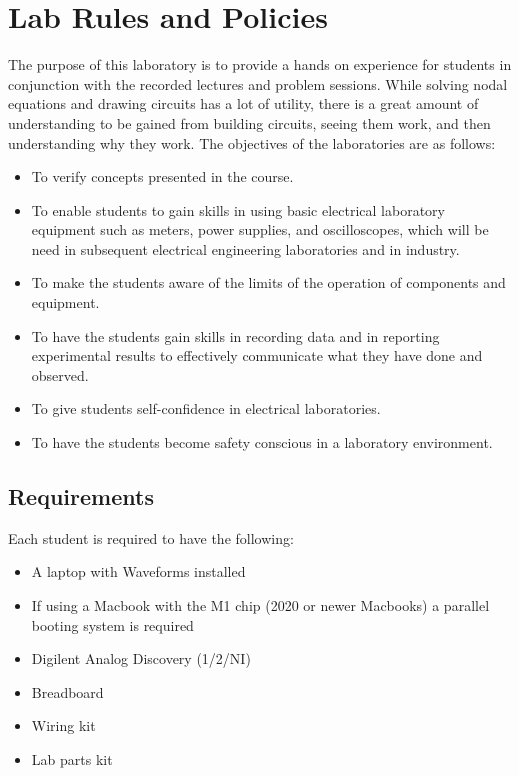 \chapter{Lab Rules and Policies}

The purpose of this laboratory is to provide a hands on experience for students in conjunction with the recorded lectures and problem sessions. While solving nodal equations and drawing circuits has a lot of utility, there is a great amount of understanding to be gained from building circuits, seeing them work, and then understanding why they work. The objectives of the laboratories are as follows:

\begin{itemize}
	\item To verify concepts presented in the course.
	\item To enable students to gain skills in using basic electrical laboratory equipment such as meters, power supplies, and oscilloscopes, which will be need in subsequent electrical engineering laboratories and in industry.
	\item To make the students aware of the limits of the operation of components and equipment.
	\item To have the students gain skills in recording data and in reporting experimental results to effectively communicate what they have done and observed.
	\item To give students self-confidence in electrical laboratories.
	\item To have the students become safety conscious in a laboratory
environment.

\end{itemize}

\section{Requirements}

Each student is required to have the following:

\begin{itemize}
	\item A laptop with Waveforms installed
	\item If using a Macbook with the M1 chip (2020 or newer Macbooks) a parallel booting system is required
	\item Digilent Analog Discovery (1/2/NI)
	\item Breadboard
	\item Wiring kit
	\item Lab parts kit 
\end{itemize}

